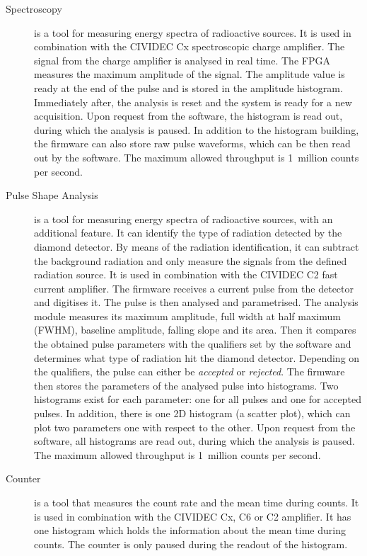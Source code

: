 \documentclass[12pt]{mytustyle}  %
\begin{document}
\begin{description}
\item[Spectroscopy] is a tool for measuring energy spectra of radioactive sources. It is used in combination with the CIVIDEC Cx spectroscopic charge amplifier. The signal from the charge amplifier is analysed in real time. The FPGA measures the maximum amplitude of the signal. The amplitude value is ready at the end of the pulse and is stored in the amplitude histogram. Immediately after, the analysis is reset and the system is ready for a new acquisition. Upon request from the software, the histogram is read out, during which the analysis is paused. In addition to the histogram building, the firmware can also store raw pulse waveforms, which can be then read out by the software. The maximum allowed throughput is 1~million counts per second.

\item[Pulse Shape Analysis] is a tool for measuring energy spectra of radioactive sources, with an additional feature. It can identify the type of radiation detected by the diamond detector. By means of the radiation identification, it can subtract the background radiation and only measure the signals from the defined radiation source. It is used in combination with the CIVIDEC C2 fast current amplifier. The firmware receives a current pulse from the detector and digitises it. The pulse is then analysed and parametrised. The analysis module measures its maximum amplitude, full width at half maximum (FWHM), baseline amplitude, falling slope and its area. Then it compares the obtained pulse parameters with the qualifiers set by the software and determines what type of radiation hit the diamond detector. Depending on the qualifiers, the pulse can either be \emph{accepted} or \emph{rejected}. The firmware then stores the parameters of the analysed pulse into histograms. Two histograms exist for each parameter: one for all pulses and one for accepted pulses. In addition, there is one 2D histogram (a scatter plot), which can plot two parameters one with respect to the other. Upon request from the software, all histograms are read out, during which the analysis is paused. The maximum allowed throughput is 1~million counts per second.

\item[Counter] is a tool that measures the count rate and the mean time during counts. It is used in combination with the CIVIDEC Cx, C6 or C2 amplifier. It has one histogram which holds the information about the mean time during counts. The counter is only paused during the readout of the histogram.
 
\end{description}
\end{document}
